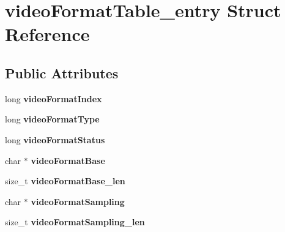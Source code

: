 \hypertarget{structvideoFormatTable__entry}{}\section{video\+Format\+Table\+\_\+entry Struct Reference}
\label{structvideoFormatTable__entry}
\subsection*{Public Attributes}
\begin{DoxyCompactItemize}
\item 
long {\bfseries video\+Format\+Index}\hypertarget{structvideoFormatTable__entry_a9976ac2fc2e91ca9645be804b020bf64}{}\label{structvideoFormatTable__entry_a9976ac2fc2e91ca9645be804b020bf64}

\item 
long {\bfseries video\+Format\+Type}\hypertarget{structvideoFormatTable__entry_addbd89d18bfa8a1682ca05926a355c52}{}\label{structvideoFormatTable__entry_addbd89d18bfa8a1682ca05926a355c52}

\item 
long {\bfseries video\+Format\+Status}\hypertarget{structvideoFormatTable__entry_a78371c49a7a2722f1943dd320858b97d}{}\label{structvideoFormatTable__entry_a78371c49a7a2722f1943dd320858b97d}

\item 
char $\ast$ {\bfseries video\+Format\+Base}\hypertarget{structvideoFormatTable__entry_a6dacc607f098f824ed5db1e1628d9d6d}{}\label{structvideoFormatTable__entry_a6dacc607f098f824ed5db1e1628d9d6d}

\item 
size\+\_\+t {\bfseries video\+Format\+Base\+\_\+len}\hypertarget{structvideoFormatTable__entry_ade656d67454f18234f33678d8bd39638}{}\label{structvideoFormatTable__entry_ade656d67454f18234f33678d8bd39638}

\item 
char $\ast$ {\bfseries video\+Format\+Sampling}\hypertarget{structvideoFormatTable__entry_a54a5bc80b9f211ad213f53414d1abffd}{}\label{structvideoFormatTable__entry_a54a5bc80b9f211ad213f53414d1abffd}

\item 
size\+\_\+t {\bfseries video\+Format\+Sampling\+\_\+len}\hypertarget{structvideoFormatTable__entry_a5378d6a8a2e316a08e3785b66a0bf1f7}{}\label{structvideoFormatTable__entry_a5378d6a8a2e316a08e3785b66a0bf1f7}


\end{DoxyCompactItemize}
